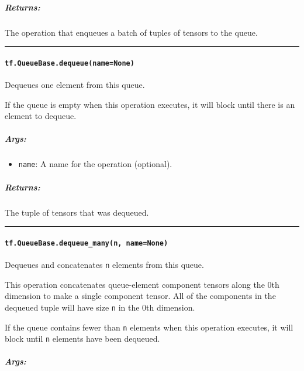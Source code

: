 \subparagraph{Returns: }\label{returns-42}

The operation that enqueues a batch of tuples of tensors to the queue.

\begin{center}\rule{0.5\linewidth}{\linethickness}\end{center}

\paragraph{\texorpdfstring{\texttt{tf.QueueBase.dequeue(name=None)}
}{tf.QueueBase.dequeue(name=None) }}\label{tf.queuebase.dequeuenamenone}

Dequeues one element from this queue.

If the queue is empty when this operation executes, it will block until
there is an element to dequeue.

\subparagraph{Args: }\label{args-49}

\begin{itemize}
\tightlist
\item
  \texttt{name}: A name for the operation (optional).
\end{itemize}

\subparagraph{Returns: }\label{returns-43}

The tuple of tensors that was dequeued.

\begin{center}\rule{0.5\linewidth}{\linethickness}\end{center}

\paragraph{\texorpdfstring{\texttt{tf.QueueBase.dequeue\_many(n,\ name=None)}
}{tf.QueueBase.dequeue\_many(n, name=None) }}\label{tf.queuebase.dequeueux5fmanyn-namenone}

Dequeues and concatenates \texttt{n} elements from this queue.

This operation concatenates queue-element component tensors along the
0th dimension to make a single component tensor. All of the components
in the dequeued tuple will have size \texttt{n} in the 0th dimension.

If the queue contains fewer than \texttt{n} elements when this operation
executes, it will block until \texttt{n} elements have been dequeued.

\subparagraph{Args: }\label{args-50}

